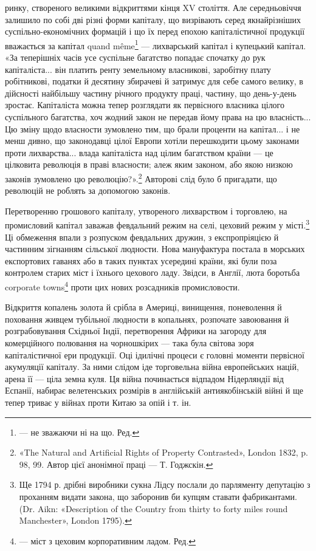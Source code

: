 \parcont{}  %
ринку, створеного великими відкриттями кінця XV століття.
Але середньовіччя залишило по собі дві різні форми капіталу,
що визрівають серед якнайрізніших суспільно-економічних
формацій і що їх перед епохою капіталістичної продукції вважається
за капітал quand même\footnote*{
— не зважаючи ні на що. Ред.
} — лихварський капітал і купецький
капітал. «За теперішніх часів усе суспільне багатство
попадає спочатку до рук капіталіста... він платить ренту земельному
власникові, заробітну плату робітникові, податки й десятину
збирачеві й затримує для себе самого велику, в дійсності
найбільшу частину річного продукту праці, частину, що день-у-день
зростає. Капіталіста можна тепер розглядати як первісного
власника цілого суспільного багатства, хоч жодний закон
не передав йому права на цю власність... Цю зміну щодо власности
зумовлено тим, що брали проценти на капітал... і не менш
дивно, що законодавці цілої Европи хотіли перешкодити цьому
законами проти лихварства... влада капіталіста над цілим багатством
країни — це цілковита революція в праві власности;
алеж яким законом, або якою низкою законів зумовлено цю
революцію?».\footnote{
«The Natural and Artificial Rights of Property Contrasted», London
1832, p. 98, 99. Автор цієї анонімної праці — Т. Годжскін.
} Авторові слід було б пригадати, що революцій
не роблять за допомогою законів.

Перетворенню грошового капіталу, утвореного лихварством
і торговлею, на промисловий капітал заважав февдальний режим
на селі, цеховий режим у місті.\footnote{
Ще 1794 р. дрібні виробники сукна Лідсу послали до парляменту
депутацію з проханням видати закона, що заборонив би купцям ставати
фабрикантами. (Dr. Aikn: «Description of the Country from thirty to forty
miles round Manchester», London 1795).
} Ці обмеження впали з розпуском
февдальних дружин, з експропріяцією й частинним зігнанням
сільської людности. Нова мануфактура постала в морських
експортових гаванях або в таких пунктах усередині
країни, які були поза контролем старих міст і їхнього цехового
ладу. Звідси, в Англії, люта боротьба corporate towns\footnote*{
— міст з цеховим корпоративним ладом. Ред.
} проти
цих нових розсадників промисловости.

Відкриття копалень золота й срібла в Америці, винищення,
поневолення й поховання живцем тубільної людности в копальнях,
розпочате завоювання й розграбовування Східньої Індії,
перетворення Африки на загороду для комерційного полювання
на чорношкірих — така була світова зоря капіталістичної ери
продукції. Оці ідилічні процеси є головні моменти первісної
акумуляції капіталу. За ними слідом іде торговельна війна европейських
націй, арена її — ціла земна куля. Ця війна починається
відпадом Нідерляндії від Еспанії, набирає велетенських розмірів
в англійській антиякобінській війні й ще тепер триває у війнах
проти Китаю за опій і т. ін.
